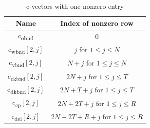 \documentclass[12pt]{article}
\numberwithin{equation}{section}
\begin{document}
\begin{table}[h!] \centering
\scriptsize
 \begin{tabular}{| c |c|} 
 
 
 \hline
          Name & Index of nonzero row   \\ 
 \hline
 \hline
    
    c\textsubscript{obnd} & 0 \\
    \hline
    c\textsubscript{wbnd}$[2,j]$ & $j$ for $1 \leq j \leq N$ \\ 
    \hline
    c\textsubscript{vbnd}$[2,j]$ & $N+j$ for $1 \leq j \leq N$ \\ 
    \hline
    c\textsubscript{ckbnd}$[2,j]$ & $2N+j$ for $1 \leq j \leq T$ \\ 
    \hline
    c\textsubscript{dkbnd}$[2,j]$ & $2N+T+j$ for $1 \leq j \leq T$ \\ 
    \hline
    c\textsubscript{ep}$[2,j]$ & $2N+2T+j$ for $1 \leq j \leq R$ \\ 
    \hline
    c\textsubscript{del}$[2,j]$ & $2N+2T+R+j$ for $1 \leq j \leq R$ \\ 

  
\hline
\end{tabular}


\caption{c-vectors with one nonzero entry}
\label{celim}
\end{table}







\renewcommand{\arraystretch}{1.5}
\end{document}
